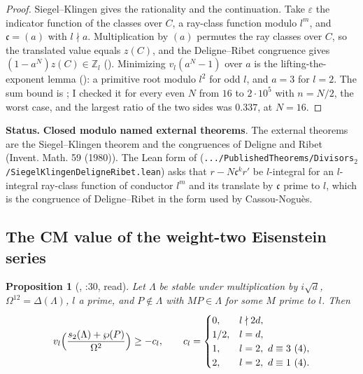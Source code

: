 \documentclass[11pt]{article}
\newcommand{\sE}{\textbf{Closed modulo named external theorems}}
\newtheorem{proposition}[theorem]{Proposition}
\theoremstyle{remark}
\begin{document}
\begin{proof}
Siegel--Klingen gives the rationality and the continuation. Take $\varepsilon$ the indicator function of the classes over $C$, a ray-class function modulo $l^m$, and $\mathfrak c=(a)$ with $l\nmid a$. Multiplication by $(a)$ permutes the ray classes over $C$, so the translated value equals $z(C)$, and the Deligne--Ribet congruence gives $(1-a^{N})z(C)\in\mathbb Z_l$ (). Minimizing $v_l(a^N-1)$ over $a$ is the lifting-the-exponent lemma (): a primitive root modulo $l^2$ for odd $l$, and $a=3$ for $l=2$. The sum bound is ; I checked it for every even $N$ from $16$ to $2\cdot10^5$ with $n=N/2$, the worst case, and the largest ratio of the two sides was $0.337$, at $N=16$.
\end{proof}

\noindent\textbf{Status.} \sE. The external theorems are the Siegel--Klingen theorem and the congruences of Deligne and Ribet (Invent. Math. 59 (1980)). The Lean form of  (\texttt{.../PublishedTheorems/Divisors}$_2$\texttt{/SiegelKlingenDeligneRibet.lean}) asks that $r-N\mathfrak c^kr'$ be $l$-integral for an $l$-integral ray-class function of conductor $l^m$ and its translate by $\mathfrak c$ prime to $l$, which is the congruence of Deligne--Ribet in the form used by Cassou-Nogu\`es.

\subsection{The CM value of the weight-two Eisenstein series}

\begin{proposition}[, :30, read]\label{prop:cmsize}
Let $\Lambda$ be stable under multiplication by $i\sqrt d$, $\Omega^{12}=\Delta(\Lambda)$, $l$ a prime, and $P\notin\Lambda$ with $MP\in\Lambda$ for some $M$ prime to $l$. Then
\[
v_l\Bigl(\frac{s_2(\Lambda)+\wp(P)}{\Omega^2}\Bigr)\ge-c_l,\qquad c_l=\begin{cases}0,&l\nmid2d,\\ 1/2,&l=d,\\ 1,&l=2,\ d\equiv3\ (4),\\ 2,&l=2,\ d\equiv1\ (4).\end{cases}
\]
\end{proposition}
\end{document}
